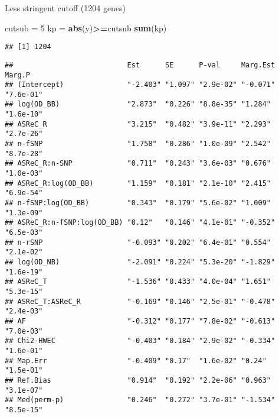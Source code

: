 \documentclass[]{article}
\newenvironment{Shaded}{\begin{snugshade}}{\end{snugshade}}
\newcommand{\KeywordTok}[1]{\textcolor[rgb]{0.13,0.29,0.53}{\textbf{#1}}}
\newcommand{\DecValTok}[1]{\textcolor[rgb]{0.00,0.00,0.81}{#1}}
\newcommand{\StringTok}[1]{\textcolor[rgb]{0.31,0.60,0.02}{#1}}
\newcommand{\OperatorTok}[1]{\textcolor[rgb]{0.81,0.36,0.00}{\textbf{#1}}}
\newcommand{\NormalTok}[1]{#1}
\begin{document}
Less stringent cutoff (1204 genes)

\begin{Shaded}
\begin{Highlighting}[]
\NormalTok{cutsub =}\StringTok{ }\DecValTok{5}
\NormalTok{kp =}\StringTok{ }\KeywordTok{abs}\NormalTok{(y)}\OperatorTok{>=}\NormalTok{cutsub}
\KeywordTok{sum}\NormalTok{(kp)}
\end{Highlighting}
\end{Shaded}

\begin{verbatim}
## [1] 1204
\end{verbatim}

\begin{Shaded}
\end{Shaded}

\begin{verbatim}
##                           Est      SE      P-val     Marg.Est Marg.P   
## (Intercept)               "-2.403" "1.097" "2.9e-02" "-0.071" "7.6e-01"
## log(OD_BB)                "2.873"  "0.226" "8.8e-35" "1.284"  "1.6e-10"
## ASReC_R                   "3.215"  "0.482" "3.9e-11" "2.293"  "2.7e-26"
## n-fSNP                    "1.758"  "0.286" "1.0e-09" "2.542"  "8.7e-28"
## ASReC_R:n-SNP             "0.711"  "0.243" "3.6e-03" "0.676"  "1.0e-03"
## ASReC_R:log(OD_BB)        "1.159"  "0.181" "2.1e-10" "2.415"  "6.9e-54"
## n-fSNP:log(OD_BB)         "0.343"  "0.179" "5.6e-02" "1.009"  "1.3e-09"
## ASReC_R:n-fSNP:log(OD_BB) "0.12"   "0.146" "4.1e-01" "-0.352" "6.5e-03"
## n-rSNP                    "-0.093" "0.202" "6.4e-01" "0.554"  "2.1e-02"
## log(OD_NB)                "-2.091" "0.224" "5.3e-20" "-1.829" "1.6e-19"
## ASReC_T                   "-1.536" "0.433" "4.0e-04" "1.651"  "5.3e-15"
## ASReC_T:ASReC_R           "-0.169" "0.146" "2.5e-01" "-0.478" "2.4e-03"
## AF                        "-0.312" "0.177" "7.8e-02" "-0.613" "7.0e-03"
## Chi2-HWEC                 "-0.403" "0.184" "2.9e-02" "-0.334" "1.6e-01"
## Map.Err                   "-0.409" "0.17"  "1.6e-02" "0.24"   "1.5e-01"
## Ref.Bias                  "0.914"  "0.192" "2.2e-06" "0.963"  "3.1e-07"
## Med(perm-p)               "0.246"  "0.272" "3.7e-01" "-1.534" "8.5e-15"
\end{verbatim}
\end{document}
